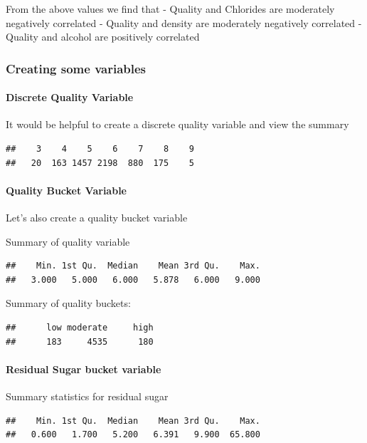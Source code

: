 \documentclass[]{article}
\let\oldparagraph\paragraph
\renewcommand{\paragraph}[1]{\oldparagraph{#1}\mbox{}}
\begin{document}
From the above values we find that - Quality and Chlorides are
moderately negatively correlated - Quality and density are moderately
negatively correlated - Quality and alcohol are positively correlated

\subsubsection{Creating some variables}\label{creating-some-variables}

\paragraph{Discrete Quality Variable}\label{discrete-quality-variable}

It would be helpful to create a discrete quality variable and view the
summary

\begin{verbatim}
##    3    4    5    6    7    8    9 
##   20  163 1457 2198  880  175    5
\end{verbatim}

\paragraph{Quality Bucket Variable}\label{quality-bucket-variable}

Let's also create a quality bucket variable

Summary of quality variable

\begin{verbatim}
##    Min. 1st Qu.  Median    Mean 3rd Qu.    Max. 
##   3.000   5.000   6.000   5.878   6.000   9.000
\end{verbatim}

Summary of quality buckets:

\begin{verbatim}
##      low moderate     high 
##      183     4535      180
\end{verbatim}

\paragraph{Residual Sugar bucket
variable}\label{residual-sugar-bucket-variable}

Summary statistics for residual sugar

\begin{verbatim}
##    Min. 1st Qu.  Median    Mean 3rd Qu.    Max. 
##   0.600   1.700   5.200   6.391   9.900  65.800
\end{verbatim}
\end{document}
